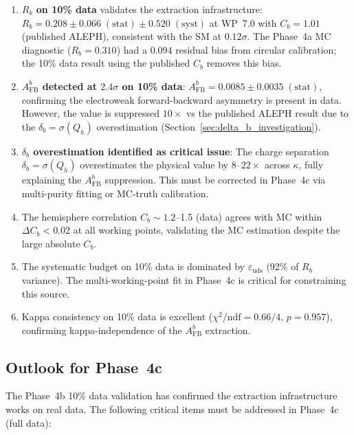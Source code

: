 \documentclass[11pt,a4paper]{article}
\begin{document}
\begin{enumerate}
\item \textbf{$R_b$ on 10\% data} validates the extraction infrastructure:
$R_b = 0.208 \pm 0.066\;\mathrm{(stat)} \pm 0.520\;\mathrm{(syst)}$ at WP~7.0
with $C_b = 1.01$ (published ALEPH), consistent with the SM at $0.12\sigma$.
The Phase~4a MC diagnostic ($R_b = 0.310$) had a $0.094$ residual bias from
circular calibration; the 10\% data result using the published $C_b$ removes
this bias.

\item \textbf{$A_\mathrm{FB}^b$ detected at $2.4\sigma$ on 10\% data}:
$A_\mathrm{FB}^b = 0.0085 \pm 0.0035\;\mathrm{(stat)}$, confirming the
electroweak forward-backward asymmetry is present in data. However, the
value is suppressed $10\times$ vs the published ALEPH result due to the
$\delta_b = \sigma(Q_h)$ overestimation (Section~\ref{sec:delta_b_investigation}).

\item \textbf{$\delta_b$ overestimation identified as critical issue}:
The charge separation $\delta_b = \sigma(Q_h)$ overestimates the physical value
by $8$--$22\times$ across $\kappa$, fully explaining the $A_\mathrm{FB}^b$ suppression.
This must be corrected in Phase~4c via multi-purity fitting or MC-truth calibration.

\item The hemisphere correlation $C_b \sim 1.2$--1.5 (data) agrees with MC within
$\Delta C_b < 0.02$ at all working points, validating the MC estimation despite
the large absolute $C_b$.

\item The systematic budget on 10\% data is dominated by $\varepsilon_\mathrm{uds}$
(92\% of $R_b$ variance). The multi-working-point fit in Phase~4c is critical for
constraining this source.

\item Kappa consistency on 10\% data is excellent ($\chi^2/\mathrm{ndf} = 0.66/4$,
$p = 0.957$), confirming kappa-independence of the $A_\mathrm{FB}^b$ extraction.
\end{enumerate}

\subsection{Outlook for Phase~4c}
\label{sec:outlook}

The Phase~4b 10\% data validation has confirmed the extraction infrastructure works
on real data. The following critical items must be addressed in Phase~4c (full data):
\end{document}
